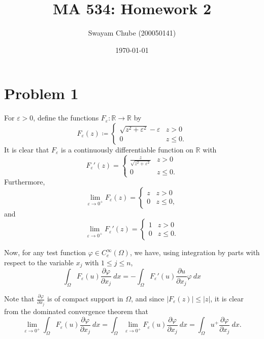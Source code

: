 \documentclass[10pt]{amsart}
\title{MA 534: Homework 2}
\author{Swayam Chube (200050141)}
\date{\today}
\theoremstyle{thmstyle}
\theoremstyle{defstyle}
\newcommand{\R}{\mathbb{R}}
\renewcommand{\le}{\leqslant}
\begin{document}
\maketitle 

\section{Problem 1}

For $\varepsilon > 0$, define the functions $F_\varepsilon: \R\to\R$ by 
\begin{equation*}
    F_\varepsilon(z) \coloneq
    \begin{cases}
        \sqrt{z^2 + \varepsilon^2} - \varepsilon & z > 0\\
        0 & z\le 0.
    \end{cases}
\end{equation*}
It is clear that $F_\varepsilon$ is a continuously differentiable function on $\R$ with 
\begin{equation*}
    F_\varepsilon'(z) = 
    \begin{cases}
        \frac{z}{\sqrt{z^2 + \varepsilon^2}} & z > 0\\
        0 & z\le 0.
    \end{cases}
\end{equation*}
Furthermore, 
\begin{equation*}
    \lim_{\varepsilon\to 0^+} F_\varepsilon(z) = 
    \begin{cases}
        z & z > 0\\
        0 & z\le 0,
    \end{cases}
\end{equation*}
and 
\begin{equation*}
    \lim_{\varepsilon\to 0^+} F_\varepsilon'(z) = 
    \begin{cases}
        1 & z > 0\\
        0 & z\le 0.
    \end{cases}
\end{equation*}

Now, for any test function $\varphi\in C_c^\infty(\Omega)$, we have, using integration by parts with respect to the variable $x_j$ with $1\le j\le n$, 
\begin{equation*}
    \int_{\Omega}F_\varepsilon(u)\frac{\partial\varphi}{\partial x_j}~dx = -\int_{\Omega}F_\varepsilon'(u)\frac{\partial u}{\partial x_j}\varphi~dx
\end{equation*}

Note that $\frac{\partial\varphi}{\partial x_j}$ is of compact support in $\Omega$, and since $|F_\varepsilon(z)|\le |z|$, it is clear from the dominated convergence theorem that 
\begin{equation*}
    \lim_{\varepsilon\to 0^+}\int_\Omega F_\varepsilon(u)\frac{\partial\varphi}{\partial x_j}~dx = \int_\Omega\lim_{\varepsilon\to 0^+} F_\varepsilon(u)\frac{\partial\varphi}{\partial x_j}~dx = \int_\Omega u^+\frac{\partial\varphi}{\partial x_j}~dx.
\end{equation*}
\end{document}
